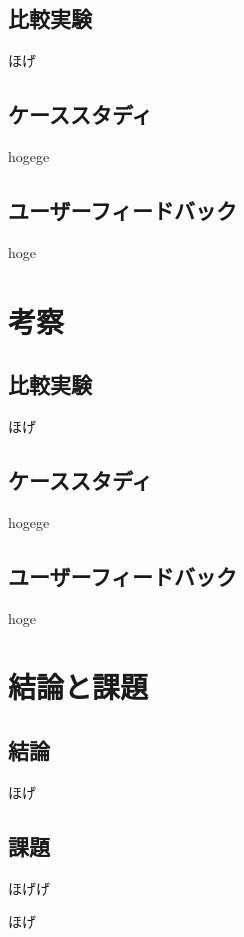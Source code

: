 \documentclass[syuuron]{kuee}
\begin{document}
	\section{比較実験}
	ほげ
	\section{ケーススタディ}
	hogege
	\section{ユーザーフィードバック}
	hoge
			
\chapter{考察}
	\section{比較実験}
	ほげ
	\section{ケーススタディ}%
	hogege
	\section{ユーザーフィードバック}
	hoge

\chapter{結論と課題}
	\section{結論}
		ほげ
	\section{課題}
		ほげげ

\begin{acknowledgements}
	ほげ
\end{acknowledgements}
\end{document}
